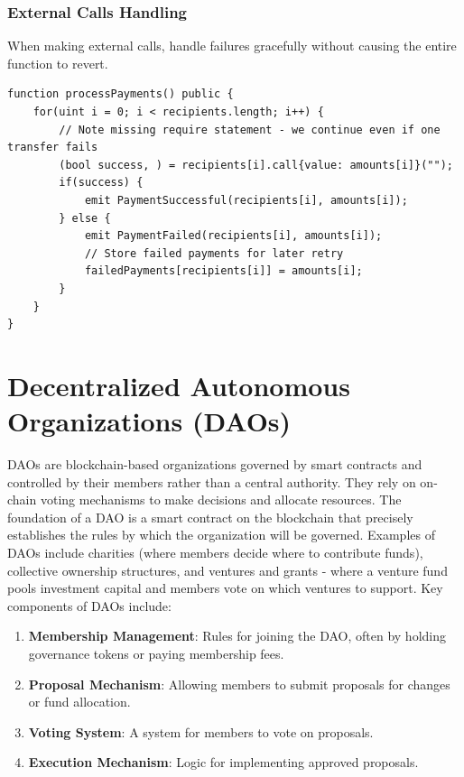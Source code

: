 \documentclass[12pt]{article}
\begin{document}
\subsubsection*{External Calls Handling}

When making external calls, handle failures gracefully without causing the entire function to revert.

\begin{lstlisting}[language=Solidity, caption=Safe External Call Example]
function processPayments() public {
    for(uint i = 0; i < recipients.length; i++) {
        // Note missing require statement - we continue even if one transfer fails
        (bool success, ) = recipients[i].call{value: amounts[i]}("");
        if(success) {
            emit PaymentSuccessful(recipients[i], amounts[i]);
        } else {
            emit PaymentFailed(recipients[i], amounts[i]);
            // Store failed payments for later retry
            failedPayments[recipients[i]] = amounts[i];
        }
    }
}
\end{lstlisting}

\section{Decentralized Autonomous Organizations (DAOs)}

DAOs are blockchain-based organizations governed by smart contracts and controlled by their members rather than a central authority. They rely on on-chain voting mechanisms to make decisions and allocate resources. The foundation of a DAO is a smart contract on the blockchain that precisely establishes the rules by which the organization will be governed. Examples of DAOs include charities (where members decide where to contribute funds), collective ownership structures, and ventures and grants - where a venture fund pools investment capital and members vote on which ventures to support. Key components of DAOs include:

\begin{enumerate}
    \item \textbf{Membership Management}: Rules for joining the DAO, often by holding governance tokens or paying membership fees.
    \item \textbf{Proposal Mechanism}: Allowing members to submit proposals for changes or fund allocation.
    \item \textbf{Voting System}: A system for members to vote on proposals.
    \item \textbf{Execution Mechanism}: Logic for implementing approved proposals.
\end{enumerate}
\end{document}
